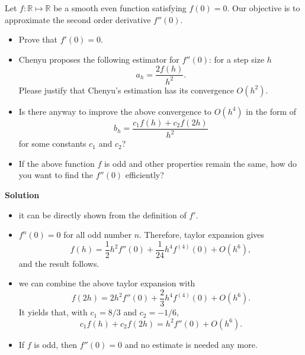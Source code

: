 \documentclass{article}
\begin{document}
Let $f:\mathbb R\mapsto \mathbb R$ be a smooth even function 
satisfying $f(0) = 0$. 
Our objective is to approximate  the second order derivative $f''(0)$. 
\begin{itemize}
 \item Prove that $f'(0) = 0.$
 \item Chenyu proposes the following estimator for $f''(0)$: for a step size $h$
 $$a_{h} = \frac{2f(h)}{h^{2}}.$$
 Please justify that Chenyu's estimation has its convergence $O(h^{2})$.
 \item Is there anyway to improve the above 
 convergence to $O(h^{4})$ in the form of 
 $$b_{h} = \frac{c_{1} f(h) + c_{2}f(2h)}{h^{2}}$$
 for some constants $c_{1}$ and $c_{2}$?
 \item If the above function $f$ is odd and other properties remain the same, how do you want to find the $f''(0)$ efficiently?
\end{itemize}

{\bf Solution}
\begin{itemize}
 \item it can be directly shown from the definition of $f'$.
 \item $f^{n}(0) = 0$ for all odd number $n$. Therefore, 
 taylor expansion gives 
 $$f(h) = \frac 1 2 h^{2} f''(0) + \frac 1 {24} h^{4}f^{(4)}(0) + O(h^{6}),$$
 and the result follows.
 \item we can combine the above taylor expansion with
 $$f(2h) = 2h^{2} f''(0) + \frac 2 3 h^{4} f^{(4)}(0) + O(h^{6}).$$
 It yields that, with $c_{1} = 8/3$ and $c_{2} = - 1/6$, 
 $$c_{1} f(h) + c_{2}f(2h) = h^{2}f''(0) + O(h^{6}).$$
 \item 
 If $f$ is odd, then $f''(0) = 0$ and no estimate is needed any more.
\end{itemize}
\end{document}
